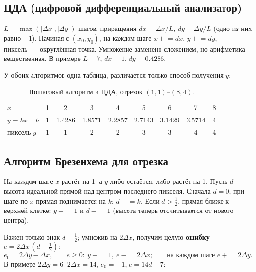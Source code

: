 \documentclass[11pt,a4paper]{article}
\begin{document}
\subsection{ЦДА (цифровой дифференциальный анализатор)}
$L = \max(|\Delta x|, |\Delta y|)$ шагов, приращения $dx = \Delta x / L$, $dy = \Delta y / L$
(одно из них равно $\pm1$). Начиная с $(x_0, y_0)$, на каждом шаге $x \mathrel{+}= dx$,
$y \mathrel{+}= dy$, пиксель~— округлённая точка. Умножение заменено сложением,
но арифметика вещественная. В примере
$L = 7$, $dx = 1$, $dy = 0.4286$.

У обоих алгоритмов одна таблица, различается только способ получения $y$:

\begin{table}[H]
\centering\small
\caption{Пошаговый алгоритм и ЦДА, отрезок $(1,1)$--$(8,4)$.}
\begin{tabular}{lcccccccc}
\toprule
$x$ & 1 & 2 & 3 & 4 & 5 & 6 & 7 & 8 \\
$y = kx + b$ & 1 & 1.4286 & 1.8571 & 2.2857 & 2.7143 & 3.1429 & 3.5714 & 4 \\
пиксель $y$ & 1 & 1 & 2 & 2 & 3 & 3 & 4 & 4 \\
\bottomrule
\end{tabular}
\end{table}

\subsection{Алгоритм Брезенхема для отрезка}
На каждом шаге $x$ растёт на 1, а $y$ либо остаётся, либо растёт на 1. Пусть $d$~—
высота идеальной прямой над центром последнего пикселя. Сначала $d = 0$; при шаге
по $x$ прямая поднимается на $k$: $d \mathrel{+}= k$. Если $d > \tfrac12$, прямая ближе
к верхней клетке: $y \mathrel{+}= 1$ и $d \mathrel{-}= 1$ (высота теперь отсчитывается
от нового центра).

Важен только знак $d - \tfrac12$; умножив на $2\Delta x$, получим целую
\textbf{ошибку} $e = 2\Delta x\,(d - \tfrac12)$:
\[
  e_0 = 2\Delta y - \Delta x,\qquad
  e \ge 0:\ y \mathrel{+}= 1,\ e \mathrel{-}= 2\Delta x;\qquad
  \text{на каждом шаге } e \mathrel{+}= 2\Delta y.
\]
В примере $2\Delta y = 6$,
$2\Delta x = 14$, $e_0 = -1$, $e = 14d - 7$:
\end{document}
